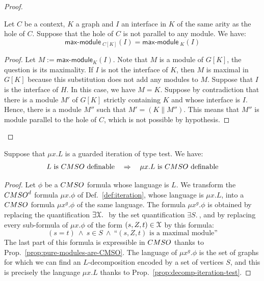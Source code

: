 \begin{proof}
\begin{lemma}\label{lem-max-modules-context} Let $C$ be a context, $K$ a graph  and $I$ an interface in $K$ of the same arity as the hole of $C$. Suppose that the hole of $C$ is not parallel to any module. We have:
$$ \mathsf{max\text{-}module}_{\;C[K]}(I)=\mathsf{max\text{-}module}_{\;K}(I)$$
\end{lemma}
\begin{proof} Let $M:=\mathsf{max\text{-}module}_K(I)$.
Note that $M$ is a module of $G[K]$,  the question is its maximality. 
If $I$ is not the interface of $K$, then $M$ is maximal in  $G[K]$ because this substitution does not add any modules to $M$. 
Suppose that $I$ is the interface of $H$. In this case, we have $M=K$. Suppose by contradiction that there is a module $M'$ of  $G[K]$ strictly  containing  $K$ and whose interface is $I$. Hence, there is a module $M''$ such that $M'=(K\parallel M'')$. This means that $M''$ is module parallel to the hole of  $C$, which is not possible by hypothesis. 
\end{proof}
\end{proof}


\begin{theorem} 
Suppose that $\mu x. L$ is a guarded iteration of type test. We have: 
$$ L\text{ is $\CMSO$ definable} \quad \Rightarrow \quad  \mu x.L \text{ is  $\CMSO$ definable}$$
\end{theorem}

\begin{proof} Let $\phi$ be a $\CMSO$ formula whose language is $L$.
We transform the $\CMSOd$ formula $\mu x. \phi$ of Def.~\ref{def:iteration}, whose language is $\mu x. L$, into a $\CMSO$ formula  ${\mu x^g. \phi}$ of the same language. The formula ${\mu x^g. \phi}$ is obtained by replacing the quantification $\exists \mathcal X.\ $ by the set quantification $\exists S.\ $, and by replacing every sub-formula of $\mu x. \phi$ of the form $(s,Z,t)\in \mathcal X$ by this formula: 
$$(s=t) \ \wedge\ s\in S \ \wedge\ \text{``$(s,Z,t)$ is a maximal module''} $$
The last part of this formula is expressible in $\CMSO$ thanks to Prop.~\ref{prop:pure-modules-are-CMSO}. The language of ${\mu x^g. \phi}$ is the set of graphs for which we can find an $L$-decomposition encoded by a set of vertices $S$, and this is precisely the language $\mu x. L$ thanks to Prop.~\ref{prop:decomp-iteration-test}.
\end{proof}

